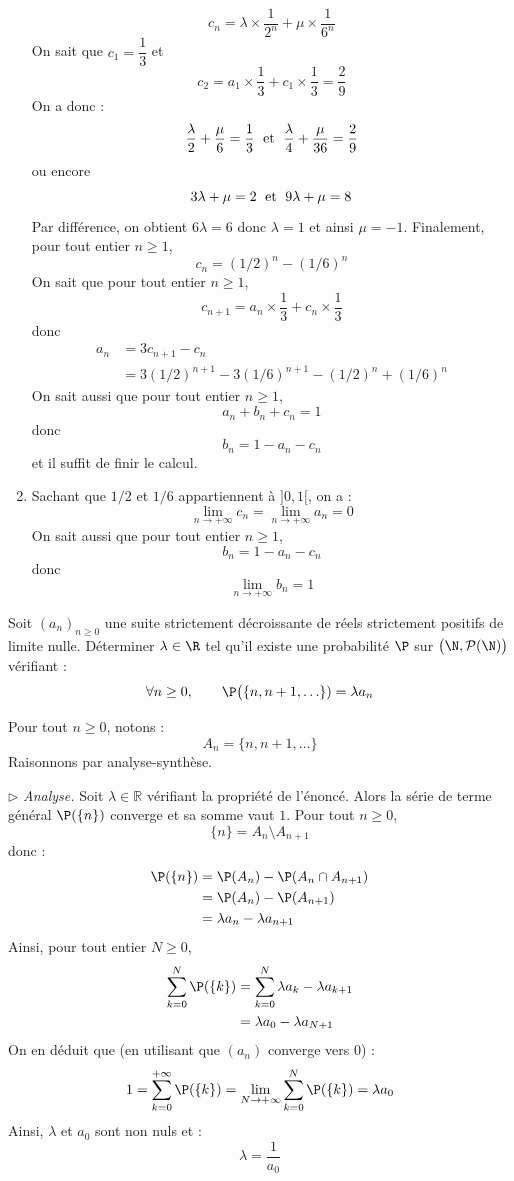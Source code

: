 \documentclass[a4paper,10pt]{report}
\begin{document}
\begin{enumerate}
$$ c_n = \lambda \times \dfrac{1}{2^n} + \mu \times \dfrac{1}{6^n}$$
On sait que $c_1= \dfrac{1}{3}$ et 
$$ c_2 = a_1 \times \dfrac{1}{3} + c_1 \times \dfrac{1}{3} = \dfrac{2}{9}$$
On a donc :
$$ \dfrac{\lambda}{2} + \dfrac{\mu}{6} = \dfrac{1}{3} \; \hbox{ et } \; \dfrac{\lambda}{4} + \dfrac{\mu}{36} = \dfrac{2}{9}$$
ou encore 
$$ 3 \lambda + \mu = 2 \; \hbox{ et } \; 9 \lambda + \mu = 8$$
Par différence, on obtient $6 \lambda = 6$ donc $\lambda=1$ et ainsi $\mu=-1$. Finalement, pour tout entier $n \geq 1$,
$$c_n = (1/2)^n-(1/6)^n$$
On sait que pour tout entier $n \geq 1$,
$$c_{n+1} = a_n \times \dfrac{1}{3} + c_n \times \dfrac{1}{3}$$
donc 
\begin{align*}
 a_n & = 3c_{n+1}-c_n  \\
 & = 3 (1/2)^{n+1}-3(1/6)^{n+1} - (1/2)^n+(1/6)^n
 \end{align*}
On sait aussi que pour tout entier $n \geq 1$,
$$ a_n + b_n + c_n  = 1$$
donc 
$$ b_n = 1-a_n -c_n$$
et il suffit de finir le calcul.
\item Sachant que $1/2$ et $1/6$ appartiennent à $]0,1[$, on a :
$$ \lim_{n \rightarrow + \infty} c_n =  \lim_{n \rightarrow + \infty} a_n = 0$$
On sait aussi que pour tout entier $n \geq 1$,
$$  b_n = 1-a_n -c_n$$
donc 
$$\lim_{n \rightarrow + \infty} b_n = 1$$
\end{enumerate}

\begin{Exercice}{} Soit $(a_n)_{n \geq 0}$ une suite strictement décroissante de réels strictement positifs de limite nulle.  Déterminer $\lambda \in \R$ tel qu'il existe une probabilité $\P$ sur $\bigl(\N,\mathcal{P}(\N)\bigr)$ vérifiant :
    \[
    \forall n \geq 0, \qquad \P\bigl( \lbrace n, n+1, \ldots \rbrace) = \lambda a_n
    \]
\end{Exercice} 

\corr Pour tout $n \geq 0$, notons :
$$ A_n = \lbrace n, n+1, \ldots \rbrace$$
Raisonnons par analyse-synthèse.

\medskip

\noindent $\rhd$ \textit{Analyse.} Soit $\lambda \in \mathbb{R}$ vérifiant la propriété de l'énoncé. Alors la série de terme général $\P (\lbrace n \rbrace)$ converge et sa somme vaut $1$. Pour tout $n \geq 0$,
$$ \lbrace n \rbrace = A_n \setminus A_{n+1}$$
donc :
\begin{align*}
 \P (\lbrace n \rbrace) & = \P (A_n) - \P (A_n \cap A_{n+1}) \\
 & = \P (A_n) - \P (A_{n+1}) \\
 & = \lambda a_n - \lambda a_{n+1}
 \end{align*}
Ainsi, pour tout entier $N \geq 0$,
\begin{align*}
\sum_{k=0}^N  \P (\lbrace k \rbrace) & = \sum_{k=0}^N\lambda a_k - \lambda a_{k+1} \\
& = \lambda a_0 - \lambda a_{N+1} 
\end{align*}
On en déduit que (en utilisant que $(a_n)$ converge vers $0$) :
$$ 1 = \sum_{k=0}^{+ \infty}  \P (\lbrace k \rbrace) = \lim_{N \rightarrow + \infty} \sum_{k=0}^N  \P (\lbrace k \rbrace) = \lambda a_0$$
Ainsi, $\lambda$ et $a_0$ sont non nuls et :
$$ \lambda = \dfrac{1}{a_0}$$
\end{document}
